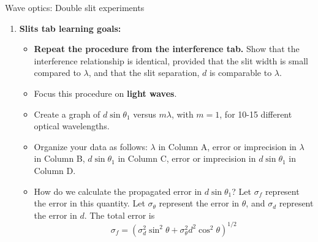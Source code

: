 \documentclass{beamer}
\begin{document}
\begin{frame}{Wave optics: Double slit experiments}
\footnotesize
\begin{enumerate}
\item \textbf{Slits tab learning goals:}
\begin{itemize}
\footnotesize
\item \textbf{Repeat the procedure from the interference tab.}  Show that the interference relationship is identical, provided that the slit width is small compared to $\lambda$, and that the slit separation, $d$ is comparable to $\lambda$.
\item Focus this procedure on \textbf{\alert{light waves}}.
\item Create a graph of $d\sin\theta_1$ versus $m\lambda$, with $m = 1$, for 10-15 different optical wavelengths.
\item Organize your data as follows: $\lambda$ in Column A, error or imprecision in $\lambda$ in Column B, $d\sin\theta_1$ in Column C, error or imprecision in $d\sin\theta_1$ in Column D.
\item How do we calculate the propagated error in $d\sin\theta_1$?  Let $\sigma_f$ represent the error in this quantity.  Let $\sigma_\theta$ represent the error in $\theta$, and $\sigma_d$ represent the error in $d$.  The total error is
\begin{equation}
\sigma_f = \left(\sigma_d^2 \sin^2\theta + \sigma_\theta^2 d^2\cos^2\theta \right)^{1/2}
\end{equation}
\end{itemize}
\end{enumerate}
\end{frame}
\end{document}
